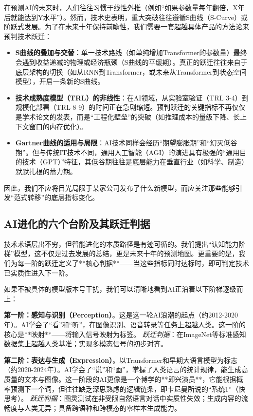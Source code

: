 在预测AI的未来时，人们往往习惯于线性外推（例如“如果参数量每年翻倍，X年后就能达到Y水平”）。然而，技术史表明，重大突破往往遵循S曲线（S-Curve）或阶跃式发展。为了在未来十年保持前瞻性，我们需要一套超越具体产品的方法论来预判技术跃迁：

\begin{itemize}
    \item \textbf{S曲线的叠加与交替}：单一技术路线（如单纯增加Transformer的参数量）最终会遇到收益递减的物理或经济瓶颈（S曲线的平缓期）。真正的跃迁往往来自于底层架构的切换（如从RNN到Transformer，或未来从Transformer到状态空间模型），开启一条新的S曲线。
    \item \textbf{技术成熟度模型（TRL）的非线性}：在AI领域，从实验室验证（TRL 3-4）到规模化部署（TRL 8-9）的时间正在急剧缩短。预判跃迁的关键指标不再仅仅是学术论文的发表，而是“工程化壁垒”的突破（如推理成本的量级下降、长上下文窗口的内存优化）。
    \item \textbf{Gartner曲线的适用与局限}：AI技术同样会经历“期望膨胀期”和“幻灭低谷期”。但与传统IT技术不同，通用人工智能（AGI）的演进具有极强的“通用目的技术（GPT）”特征，其低谷期往往是底层能力在垂直行业（如科学、制造）默默扎根的蓄力期。
\end{itemize}

因此，我们不应将目光局限于某家公司发布了什么新模型，而应关注那些能够引发“范式转移”的底层指标变化。

\subsection{AI进化的六个台阶及其跃迁判据}

技术术语层出不穷，但智能进化的本质路径是有迹可循的。我们提出“认知能力阶梯”模型，这不仅是过去发展的总结，更是未来十年的预测地图。更重要的是，我们为每一阶的跃迁定义了**核心判据**——当这些指标同时达标时，即可判定技术已实质性进入下一阶。

如果不被具体的模型版本号干扰，我们可以清晰地看到AI正沿着以下阶梯逐级而上：

		\textbf{第一阶：感知与识别（Perception）}。这是这一轮AI浪潮的起点（约2012-2020年）。AI学会了“看”和“听”，在图像识别、语音转录等任务上超越人类。这一阶的核心是**映射**——将输入信号映射为标签。
		\textit{跃迁判据}：在ImageNet等标准感知数据集上超越人类基准；实现多模态信号的初步对齐。

		\textbf{第二阶：表达与生成（Expression）}。以Transformer和早期大语言模型为标志（约2020-2024年）。AI学会了“说”和“画”，掌握了人类语言的统计规律，能生成高质量的文本与图像。这一阶段的AI更像是一个博学的**即兴演员**，它能根据概率预测下一个词，但往往缺乏深思熟虑的逻辑链条，即卡尼曼所说的“系统1”（快思考）。
		\textit{跃迁判据}：图灵测试在非受限自然语言对话中实质性失效；生成内容的流畅度与人类无异；具备跨语种和跨模态的零样本生成能力。

